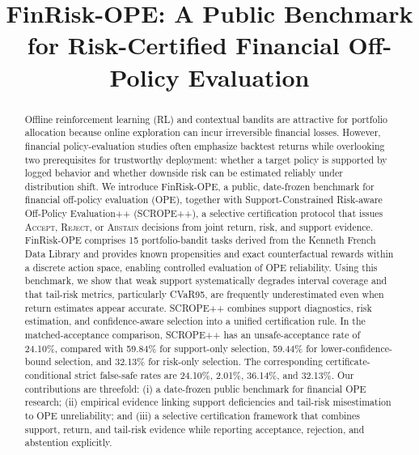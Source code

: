 \documentclass[conference]{IEEEtran}
\begin{document}
\title{FinRisk-OPE: A Public Benchmark for Risk-Certified Financial Off-Policy Evaluation}

\author{



}

\maketitle

\begin{abstract}
Offline reinforcement learning (RL) and contextual bandits are attractive for portfolio allocation because online exploration can incur irreversible financial losses. However, financial policy-evaluation studies often emphasize backtest returns while overlooking two prerequisites for trustworthy deployment: whether a target policy is supported by logged behavior and whether downside risk can be estimated reliably under distribution shift. We introduce FinRisk-OPE, a public, date-frozen benchmark for financial off-policy evaluation (OPE), together with Support-Constrained Risk-aware Off-Policy Evaluation++ (SCROPE++), a selective certification protocol that issues \textsc{Accept}, \textsc{Reject}, or \textsc{Abstain} decisions from joint return, risk, and support evidence.
FinRisk-OPE comprises 15 portfolio-bandit tasks derived from the Kenneth French Data Library and provides known propensities and exact counterfactual rewards within a discrete action space, enabling controlled evaluation of OPE reliability. Using this benchmark, we show that weak support systematically degrades interval coverage and that tail-risk metrics, particularly CVaR95, are frequently underestimated even when return estimates appear accurate. SCROPE++ combines support diagnostics, risk estimation, and confidence-aware selection into a unified certification rule. In the matched-acceptance comparison, SCROPE++ has an unsafe-acceptance rate of 24.10\%, compared with 59.84\% for support-only selection, 59.44\% for lower-confidence-bound selection, and 32.13\% for risk-only selection. The corresponding certificate-conditional strict false-safe rates are 24.10\%, 2.01\%, 36.14\%, and 32.13\%.
Our contributions are threefold: (i) a date-frozen public benchmark for financial OPE research; (ii) empirical evidence linking support deficiencies and tail-risk misestimation to OPE unreliability; and (iii) a selective certification framework that combines support, return, and tail-risk evidence while reporting acceptance, rejection, and abstention explicitly.
\end{abstract}
\end{document}
